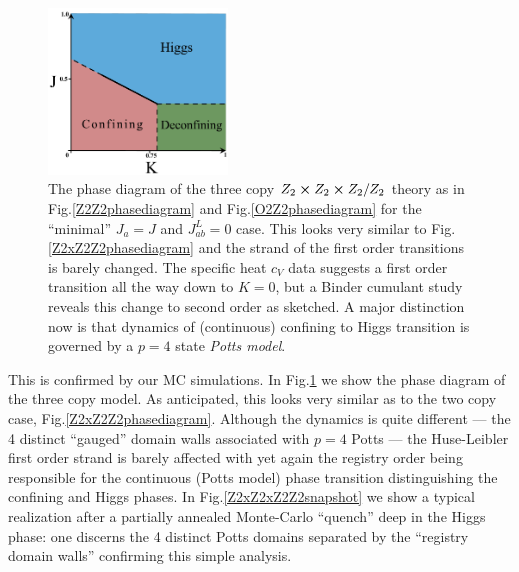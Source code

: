 \begin{figure}[!h]
	\centering	\includegraphics[width=0.425\textwidth]{figures/chapter2/Z2xZ2xZ2Z2phasedia.pdf}
	\caption{The phase diagram of the three copy $Z_2 \cross Z_2  \cross Z_2/ Z_2$ theory as in Fig.\ref{Z2Z2phasediagram} and Fig.\ref{O2Z2phasediagram} for the ``minimal'' $J_a =J$ and $J^L_{ab} = 0 $ case. This looks very similar to Fig.\ref{Z2xZ2Z2phasediagram} and the strand of the first order transitions is barely changed. The specific heat $c_V$ data suggests a first order transition all the way down to $K=0$, but a Binder cumulant study reveals this change to second order as sketched. A major distinction now is that dynamics of (continuous) confining to Higgs transition is governed by a $p=4$ state \textit{Potts model}.} 
	\label{Z2xZ2xZ2Z2phasediagram}
\end{figure} 

This is confirmed by our MC simulations. In Fig.\ref{Z2xZ2xZ2Z2phasediagram} we show the phase diagram of the three copy model. As anticipated, this looks very similar as to the two  copy case, Fig.\ref{Z2xZ2Z2phasediagram}. Although the dynamics is quite different --- the 4 distinct ``gauged'' domain walls associated with $p=4$ Potts --- the Huse-Leibler first order strand is barely affected with yet again the registry order being responsible for the continuous (Potts model) phase transition distinguishing the confining and Higgs phases. In Fig.\ref{Z2xZ2xZ2Z2snapshot} we show a typical  realization after a partially annealed Monte-Carlo ``quench'' deep in the Higgs phase: one discerns the 4 distinct Potts domains separated by the ``registry domain walls'' confirming this simple analysis.  

